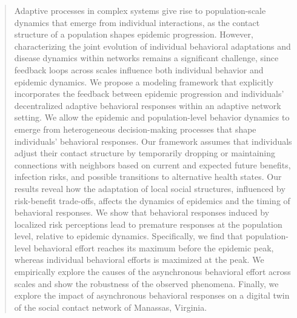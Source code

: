 \documentclass[9pt,twocolumn,twoside]{pnas-new}
\begin{document}
\begin{abstract} %
Adaptive processes in complex systems give rise to population-scale dynamics that emerge from individual interactions, as the contact structure of a population shapes epidemic progression. 
However, characterizing the joint evolution of individual behavioral adaptations and disease dynamics within networks remains a significant challenge, since feedback loops across scales influence both individual behavior and epidemic dynamics.
%
We propose a modeling framework that explicitly incorporates the feedback between epidemic progression and individuals' decentralized adaptive behavioral responses within an adaptive network setting. We allow the epidemic and population-level behavior dynamics to emerge from heterogeneous decision-making processes that shape individuals' behavioral responses.
%
Our framework assumes that individuals adjust their contact structure by temporarily dropping or maintaining connections with neighbors based on current and expected future benefits, infection risks, and possible transitions to alternative health states.
%
Our results reveal how the adaptation of local social structures, influenced by risk-benefit trade-offs, affects the dynamics of epidemics and the timing of behavioral responses.
%
We show that behavioral responses induced by localized risk perceptions lead to premature responses at the population level, relative to epidemic dynamics. 
Specifically, we find that population-level behavioral effort reaches its maximum before the epidemic peak, whereas individual behavioral efforts is maximized at the peak.
%
We empirically explore the causes of the asynchronous behavioral effort across scales and show the robustness of the observed phenomena. Finally, we explore the impact of asynchronous behavioral responses on a digital twin of the social contact network of Manassas, Virginia.
\end{abstract}


\maketitle
\thispagestyle{firststyle}


\end{document}
